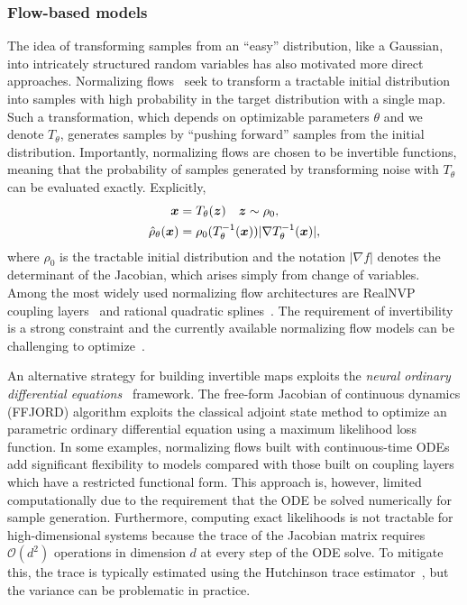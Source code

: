 \documentclass[11pt]{article}
\begin{document}
\subsubsection{Flow-based models}

The idea of transforming samples from an ``easy'' distribution, like a Gaussian, into intricately structured random variables has also motivated more direct approaches.
Normalizing flows~\cite{tabak_density_2010,rezende_variational_2015} seek to transform a tractable initial distribution into samples with high probability in the target distribution with a single map.
Such a transformation, which depends on optimizable parameters $\theta$ and we denote $T_{\theta}$, generates samples by ``pushing forward'' samples from the initial distribution. 
Importantly, normalizing flows are chosen to be invertible functions, meaning that the probability of samples generated by transforming noise with $T_{\theta}$ can be evaluated exactly.
Explicitly,
\begin{equation}
\begin{aligned}
    \boldsymbol{x} &= T_{\theta}(\boldsymbol{z}) \quad \boldsymbol{z} \sim \rho_0, \\
    \hat \rho_\theta(\boldsymbol{x}) &= \rho_0(T_{\theta}^{-1}(\boldsymbol{x})) |\nabla T_{\theta}^{-1}(\boldsymbol{x})|,
\end{aligned}
\end{equation}
where $\rho_0$ is the tractable initial distribution and the notation $|\nabla f|$ denotes the determinant of the Jacobian, which arises simply from change of variables. 
Among the most widely used normalizing flow architectures are RealNVP coupling layers~\cite{dinh_density_2017} and rational quadratic splines~\cite{}.
The requirement of invertibility is a strong constraint and the currently available normalizing flow models can be challenging to optimize~\cite{}.

An alternative strategy for building invertible maps exploits the \emph{neural ordinary differential equations}~\cite{chen_neural_2018} framework.
The free-form Jacobian of continuous dynamics (FFJORD) algorithm exploits the classical adjoint state method to optimize an parametric ordinary differential equation using a maximum likelihood loss function. 
In some examples, normalizing flows built with continuous-time ODEs add significant flexibility to models compared with those built on coupling layers which have a restricted functional form.
This approach is, however, limited computationally due to the requirement that the ODE be solved numerically for sample generation. 
Furthermore, computing exact likelihoods is not tractable for high-dimensional systems because the trace of the Jacobian matrix requires $\mathcal{O}(d^2)$ operations in dimension $d$ at every step of the ODE solve.
To mitigate this, the trace is typically estimated using the Hutchinson trace estimator~\cite{hutchinson_stochastic_1989}, but the variance can be problematic in practice. 
\end{document}

